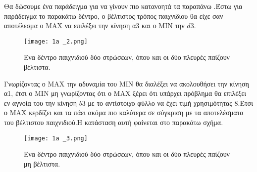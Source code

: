 \documentclass[10pt]{article}
\begin{document}
Θα δώσουμε ένα παράδειγμα για να γίνουν πιο κατανοητά τα παραπάνω .Έστω για παράδειγμα το παρακάτω δέντρο, ο βέλτιστος τρόπος παιχνιδιου θα είχε σαν αποτέλεσμα ο ΜΑΧ να επιλέξει την κίνηση α3 και ο ΜΙΝ την $d3$.

\begin{figure}[H]
    \texttt{[image: 1a \_2.png]}\\
    \caption{Ένα δέντρο παιχνιδιού δύο στρώσεων, όπου και οι δύο πλευρές παίζουν βέλτιστα.}
\end{figure} 

Γνωρίζοντας ο ΜΑΧ την αδυναμία του ΜΙΝ θα διαλέξει να ακολουθήσει την κίνηση α1, έτσι ο ΜΙΝ μη γνωρίζοντας ότι ο ΜΑΧ ξέρει ότι υπάρχει πρόβλημα θα επιλέξει εν αγνοία του την κίνηση $b3$ με το αντίστοιχο  φύλλο να έχει τιμή χρησιμότητας 8.Έτσι ο ΜΑΧ κερδίζει και τα πάει ακόμα πιο καλύτερα σε σύγκριση με τα αποτελέσματα του βέλτιστου παιχνιδιού.Η κατάσταση αυτή φαίνεται στο παρακάτω σχήμα.

\begin{figure}[H]
    \texttt{[image: 1a \_3.png]}\\
    \caption{Ένα δέντρο παιχνιδιού δύο στρώσεων, όπου και οι δύο πλευρές παίζουν μη βέλτιστα.}
\end{figure} 
\end{document}
